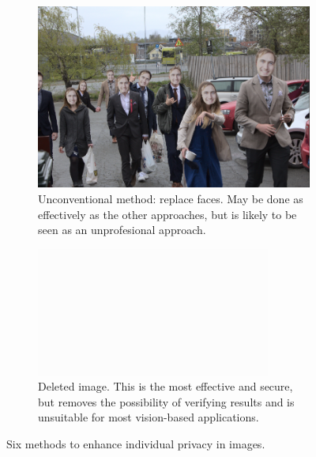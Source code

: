 \begin{figure}[H]
    \begin{subfigure}{0.46\textwidth}
        \centering
        \includegraphics[width=\textwidth]{Images/Obfuscation/me_my_friends_and_I.png}
        \caption{\centering Unconventional method: replace faces. May be done as effectively as the other approaches, but is likely to be seen as an unprofesional approach.}
    \end{subfigure}
    \hfill
    \begin{subfigure}{0.46\textwidth}
        \centering
        \includegraphics[width=\textwidth]{Images/Obfuscation/white.png}
        \caption{\centering Deleted image. This is the most effective and secure, but removes the possibility of verifying results and is unsuitable for most vision-based applications.}
    \end{subfigure}

    \caption{\centering Six methods to enhance individual privacy in images.}
    \label{fig:obfuscation_methods}
\end{figure}


